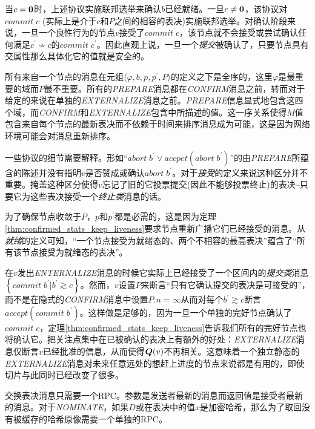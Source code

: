 当$c={\bm 0}$时，上述协议实施联邦选举来确认$b$已经就绪。一旦$c\neq {\bm 0}$，该协议对$commit\;c$ (实际上是介于$c$和$P$之间的相容的表决)实施联邦选举。对确认阶段来说，一旦一个良性行为的节点$v$接受了$commit\;c$，该节点就不会接受或尝试确认任何满足$c^{\prime}\not\sim c$的$commit\;c^{\prime}$。因此直观上说，一旦一个\textit{提交}被确认了，只要节点具有{\quorum}交属性那么具体化它的值就是安全的。

所有来自一个节点的消息在元组$\langle \varphi,b,p,p^{\prime},P\rangle$的定义之下是全序的，这里$\varphi$是最重要的域而$P$最不重要。所有的\textsl{PREPARE}消息都在\textsl{CONFIRM}消息之前，转而对于给定的{\slot}来说在单独的\textsl{EXTERNALIZE}消息之前。\textsl{PREPARE}信息显式地包含这四个域，而\textsl{CONFIRM}和\textsl{EXTERNALIZE}包含中所描述的值。这一序关系使得$M$值包含来自每个节点的最新表决而不依赖于时间来排序消息成为可能，这是因为网络环境可能会对消息重新排序。

一些协议的细节需要解释。形如``$abort\;b^{\prime}\vee accpet(abort\;b^{\prime})$''的由\textsl{PREPARE}所蕴含的陈述并没有指明$v$是否赞成或确认$abort\;b^{\prime}$。对于\textit{接受}的定义来说这种区分并不重要。掩盖这种区分使得$v$忘记了旧的它投票提交(因此不能够投票终止)的表决--只要它为这些表决接受一个\textit{终止类}消息的话。

为了确保节点收敛于$P$，$p$和$p^{\prime}$都是必需的，这是因为定理\ref{thm:confirmed_stats_keep_liveness}要求节点重新广播它们已经接受的消息。从\textit{就绪}的定义可知，``一个节点接受为就绪态的、两个不相容的最高表决''蕴含了``所有该节点接受为就绪态的表决''。

在$v$发出\textsl{ENTERNALIZE}消息的时候它实际上已经接受了一个区间内的\textit{提交类}消息$\left\{commit\;b^{\prime}|b^{\prime}\gtrsim c\right\}$。然而，$v$设置$P$来断言``只有它确认提交的表决是可接受的''，而不是在隐式的\textsl{CONFIRM}消息中设置$P.n=\infty$从而对每个$b^{\prime}\gtrsim c$断言$accept(commit\;b^{\prime})$。这样做是足够的，因为一旦一个单独的完好节点确认了$commit\;c$，定理\ref{thm:confirmed_stats_keep_liveness}告诉我们所有的完好节点也将确认它。把关注点集中在已被确认的表决上有额外的好处：\textsl{EXTERNALIZE}消息仅断言$v$已经批准的信息，从而使得${\bm Q}(v)$不再相关。这意味着一个独立静态的\textsl{EXTERNALIZE}消息对未来任意远处的想赶上进度的节点来说都是有用的，即使{\quorum}切片与此同时已经改变了很多。

交换表决消息只需要一个RPC。参数是发送者最新的消息而返回值是接受者最新的消息。对于\textsl{NOMINATE}，如果$D$或在表决中的值$x$是加密哈希，那么为了取回没有被缓存的哈希原像需要一个单独的RPC。